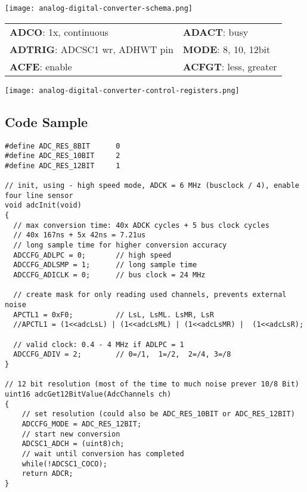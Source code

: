\texttt{[image: analog-digital-converter-schema.png]}


\begin{tabular}{ll}
    \textbf{ADCO}: 1x, continuous         & \textbf{ADACT}: busy \\
    \textbf{ADTRIG}: ADCSC1 wr, ADHWT pin & \textbf{MODE}: 8, 10, 12bit \\
    \textbf{ACFE}: enable    & \textbf{ACFGT}: less, greater \\
\end{tabular}

\texttt{[image: analog-digital-converter-control-registers.png]}

\subsection{Code Sample}

\begin{lstlisting}
#define ADC_RES_8BIT      0
#define ADC_RES_10BIT     2
#define ADC_RES_12BIT     1

// init, using - high speed mode, ADCK = 6 MHz (busclock / 4), enable four line sensor
void adcInit(void)
{
  // max conversion time: 40x ADCK cycles + 5 bus clock cycles
  // 40x 167ns + 5x 42ns = 7.21us
  // long sample time for higher conversion accuracy
  ADCCFG_ADLPC = 0;       // high speed
  ADCCFG_ADLSMP = 1;      // long sample time
  ADCCFG_ADICLK = 0;      // bus clock = 24 MHz

  // create mask for only reading used channels, prevents external noise
  APCTL1 = 0xF0;          // LsL, LsML. LsMR, LsR
  //APCTL1 = (1<<adcLsL) | (1<<adcLsML) | (1<<adcLsMR) |  (1<<adcLsR);

  // valid clock: 0.4 - 4 MHz if ADLPC = 1
  ADCCFG_ADIV = 2;        // 0=/1,  1=/2,  2=/4, 3=/8
}

// 12 bit resolution (most of the time to much noise prever 10/8 Bit)
uint16 adcGet12BitValue(AdcChannels ch)
{
    // set resolution (could also be ADC_RES_10BIT or ADC_RES_12BIT)
    ADCCFG_MODE = ADC_RES_12BIT;
    // start new conversion
    ADCSC1_ADCH = (uint8)ch;
    // wait until conversion has completed
    while(!ADCSC1_COCO);
    return ADCR;
}

\end{lstlisting}

